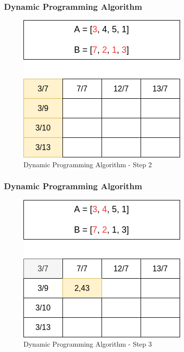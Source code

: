 \documentclass{beamer}
\begin{document}
    \begin{frame}
      \frametitle{Dynamic Programming Algorithm}
      
      \begin{figure}
		\centering
		\includegraphics[scale=.48]{dp_4.png}
		\caption{Dynamic Programming Algorithm - Step 2}
		\label{fig:dynamic_programming_algorithm_4}
	  \end{figure}
      
    \end{frame}
    
    \begin{frame}
      \frametitle{Dynamic Programming Algorithm}
      
      \begin{figure}
		\centering
		\includegraphics[scale=.48]{dp_5.png}
		\caption{Dynamic Programming Algorithm - Step 3}
		\label{fig:dynamic_programming_algorithm_5}
	  \end{figure}
      
    \end{frame}
    
\end{document}
